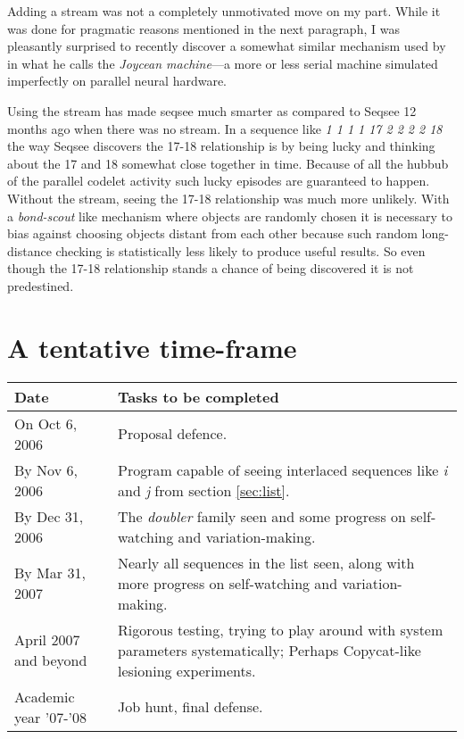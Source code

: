 \documentclass[letterpaper]{article}
\begin{document}
 Adding a stream was not a completely unmotivated move on my part. While it was done for pragmatic reasons mentioned in the next paragraph, I was pleasantly surprised to recently discover a somewhat similar mechanism used by  in what he calls the \emph{Joycean machine}---a more or less serial machine simulated imperfectly on parallel neural hardware.

Using the stream has made seqsee much smarter as compared to Seqsee 12 months ago when there was no stream.  In a sequence like \emph{1 1 1 1 17 2 2 2 2 18} the way Seqsee discovers the 17-18 relationship is by being lucky and thinking about the 17 and 18 somewhat close together in time.  Because of all the hubbub of the parallel codelet activity such lucky episodes are guaranteed to happen.  Without the stream, seeing the 17-18 relationship was much more unlikely.  With a \emph{bond-scout} like mechanism where objects are randomly chosen it is necessary to bias against choosing objects distant from each other because such random long-distance checking is statistically less likely to produce useful results.  So even though the 17-18 relationship stands a chance of being discovered it is not predestined.


\section{A tentative time-frame}
\begin{tabular}{l|p{4in}}
 \textbf{Date} & \textbf{Tasks to be completed}\\ \hline
On Oct 6, 2006 & Proposal defence. \\
By Nov 6, 2006 & Program capable of seeing interlaced sequences like \emph{i} and \emph{j} from section \ref{sec:list}.\\
By Dec 31, 2006 & The \emph{doubler} family seen and some progress on self-watching and variation-making.\\
By Mar 31, 2007 & Nearly all sequences in the list seen, along with more  progress on self-watching and variation-making.\\
April 2007 and beyond & Rigorous testing, trying to play around with system parameters systematically; Perhaps Copycat-like lesioning experiments.\\
Academic year '07-'08 & Job hunt, final defense.\\
\hline 
\end{tabular}


\printindex
\end{document}
